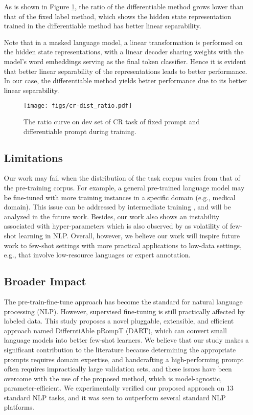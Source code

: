 \documentclass{article} \usepackage{iclr2022_conference,times}
\begin{document}
As is shown in Figure \ref{ratio}, the  ratio of the differentiable method grows lower than that of the fixed label method, which shows the hidden state representation trained in the differentiable method has better linear separability.

Note that in a masked language model, a linear transformation is performed on the hidden state representations, with a linear decoder sharing weights with the model's word embeddings serving as the final token classifier. 
Hence it is evident that better linear separability of the representations leads to better performance. 
In our case, the differentiable method yields better performance due to its better linear separability.

\begin{figure}
\centering 
\texttt{[image: figs/cr-dist\_ratio.pdf]}  
\caption{The  ratio curve on dev set of CR task of fixed prompt and differentiable prompt during training.}
\label{ratio}  
\end{figure}



\subsection{Limitations}\label{limit}
Our work may fail when the distribution of the task corpus varies from that of the pre-training corpus. 
For example, a general pre-trained language model may be fine-tuned with more training instances in a specific domain (e.g., medical domain).
This issue can be addressed by intermediate training \citep{DBLP:journals/corr/abs-1811-01088,DBLP:conf/emnlp/YinRRSX20,DBLP:journals/corr/abs-2102-09690}, and will be analyzed in the future work.
Besides, our work also shows an instability associated with hyper-parameters which is also observed by \cite{DBLP:journals/corr/abs-2002-06305,zhang2021revisiting,Ethan2021true} as volatility of few-shot learning in NLP.  
Overall, however, we believe our work will inspire future work to few-shot settings with more practical applications to low-data settings, e.g., that involve low-resource languages or expert annotation.

\subsection{Broader Impact}

The pre-train-fine-tune approach has become the standard for natural language processing (NLP). 
However, supervised fine-tuning is still practically affected by labeled data.
This study proposes a novel pluggable, extensible, and efficient approach named DifferntiAble pRompT (DART), which can convert small language models into better few-shot learners. 
We believe that our study makes a significant contribution to the literature because determining the appropriate prompts requires domain expertise, and handcrafting a high-performing prompt often requires impractically large validation sets, and these issues have been overcome with the use of the proposed method, which is model-agnostic, parameter-efficient. We experimentally verified our proposed approach on 13 standard NLP tasks, and it was seen to outperform several standard NLP platforms.
\end{document}
